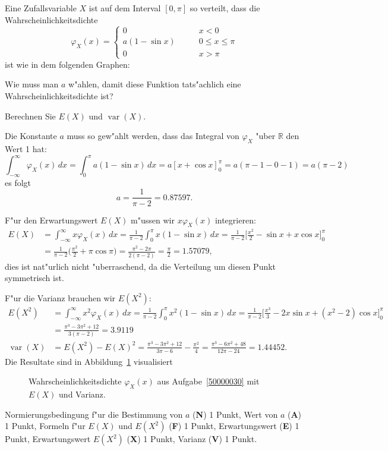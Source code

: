 Eine Zufallsvariable $X$ ist auf dem Interval $[0,\pi]$ so verteilt,
dass die Wahrscheinlichkeitsdichte
\[
\varphi_X(x)
=
\begin{cases}
0&\qquad x < 0\\
a(1-\sin x)&\qquad 0\le x \le \pi\\
0&\qquad x > \pi
\end{cases}
\]
ist wie in dem folgenden Graphen:
\begin{center}
\end{center}
\begin{teilaufgaben}
\item
Wie muss man $a$ w"ahlen, damit diese Funktion tats"achlich 
eine Wahrscheinlichkeitsdichte ist?
\item
Berechnen Sie $E(X)$ und $\operatorname{var}(X)$.
\end{teilaufgaben}

\begin{loesung}
\begin{teilaufgaben}
\item Die Konstante $a$ muss so gew"ahlt werden, dass das Integral von
$\varphi_X$ "uber $\mathbb R$ den Wert 1 hat:
\[
\int_{-\infty}^{\infty}\varphi_X(x)\,dx
=
\int_0^\pi a(1-\sin x)\,dx
=
a[x+\cos x]_0^\pi
=
a(\pi - 1 - 0 - 1) = a(\pi-2)
\]
es folgt
\[
a=\frac1{\pi -2}=0.87597.
\]
\item
F"ur den Erwartungswert $E(X)$ m"ussen wir $x\varphi_X(x)$ integrieren:
\begin{align*}
E(X)
&=
\int_{-\infty}^\infty x\varphi_X(x)\,dx
=
\frac1{\pi-2}\int_0^\pi x(1-\sin x)\,dx
=
\frac1{\pi - 2} \biggl[\frac{x^2}{2}-\sin x + x\cos x\biggr]_0^\pi
\\
&=
\frac1{\pi - 2}\biggl(\frac{\pi^2}{2} +\pi\cos\pi\biggr)
=
\frac{\pi^2-2\pi}{2(\pi-2)}=\frac{\pi}{2} = 1.57079,
\end{align*}
dies ist nat"urlich nicht "uberraschend, da die Verteilung um diesen
Punkt symmetrisch ist.

F"ur die Varianz brauchen wir $E(X^2)$:
\begin{align*}
E(X^2)
&=
\int_{-\infty}^\infty x^2\varphi_X(x)\,dx
=
\frac1{\pi-2}\int_0^\pi x^2(1-\sin x)\,dx
=
\frac1{\pi-2}\biggl[
\frac{x^3}{3}-2x\sin x+(x^2-2)\cos x
\biggr]_0^\pi
\\
&=
\frac{\pi^3-3\pi^2+12}{3(\pi-2)}
=
3.9119
\\
\operatorname{var}(X)
&=
E(X^2)-E(X)^2
=
\frac{\pi^3-3\pi^2+12}{3\pi - 6}
-
\frac{\pi^2}{4}
=
\frac {\pi^3-6\pi^2+48}{12\pi-24}
=
1.44452.
\end{align*}
Die Resultate sind in Abbildung~\ref{50000030:graphplus} visualisiert
\begin{figure}
\centering
{}
\caption{Wahrscheinlichkeitsdichte $\varphi_X(x)$ aus Aufgabe~\ref{50000030}
mit $E(X)$ und Varianz.
\label{50000030:graphplus}}
\end{figure}
\end{teilaufgaben}
\end{loesung}

\begin{bewertung}
Normierungsbedingung f"ur die Bestimmung von $a$ ({\bf N}) 1 Punkt,
Wert von $a$ ({\bf A}) 1 Punkt,
Formeln f"ur $E(X)$ und $E(X^2)$ ({\bf F}) 1 Punkt,
Erwartungswert ({\bf E}) 1 Punkt,
Erwartungswert $E(X^2)$ ({\bf X}) 1 Punkt,
Varianz ({\bf V}) 1 Punkt.
\end{bewertung}


